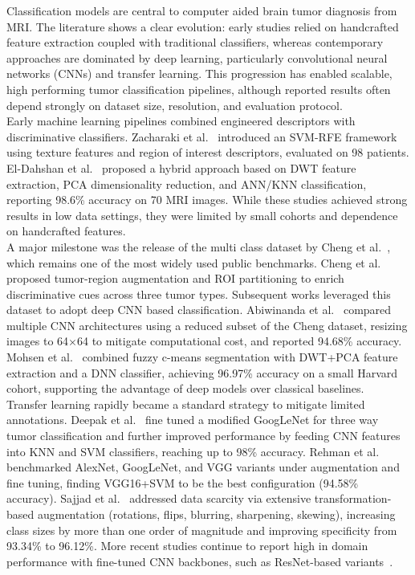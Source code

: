 Classification models are central to computer aided brain tumor diagnosis from MRI. The literature shows a clear evolution: early studies relied on handcrafted feature extraction coupled with traditional classifiers, whereas contemporary approaches are dominated by deep learning, particularly convolutional neural networks (CNNs) and transfer learning. This progression has enabled scalable, high performing tumor classification pipelines, although reported results often depend strongly on dataset size, resolution, and evaluation protocol.\\

Early machine learning pipelines combined engineered descriptors with discriminative classifiers. Zacharaki et al.~\cite{5193232} introduced an SVM-RFE framework using texture features and region of interest descriptors, evaluated on 98 patients. El-Dahshan et al.~\cite{ELDAHSHAN2010433} proposed a hybrid approach based on DWT feature extraction, PCA dimensionality reduction, and ANN/KNN classification, reporting 98.6\% accuracy on 70 MRI images. While these studies achieved strong results in low data settings, they were limited by small cohorts and dependence on handcrafted features.\\

A major milestone was the release of the multi class dataset by Cheng et al.~\cite{Cheng2015}, which remains one of the most widely used public benchmarks. Cheng et al. proposed tumor-region augmentation and ROI partitioning to enrich discriminative cues across three tumor types. Subsequent works leveraged this dataset to adopt deep CNN based classification. Abiwinanda et al.~\cite{abiwinanda} compared multiple CNN architectures using a reduced subset of the Cheng dataset, resizing images to 64$\times$64 to mitigate computational cost, and reported 94.68\% accuracy. Mohsen et al.~\cite{mohsen2018classification} combined fuzzy c-means segmentation with DWT+PCA feature extraction and a DNN classifier, achieving 96.97\% accuracy on a small Harvard cohort, supporting the advantage of deep models over classical baselines.\\

Transfer learning rapidly became a standard strategy to mitigate limited annotations. Deepak et al.~\cite{deepak2019brain} fine tuned a modified GoogLeNet for three way tumor classification and further improved performance by feeding CNN features into KNN and SVM classifiers, reaching up to 98\% accuracy. Rehman et al.~\cite{Rehman2020} benchmarked AlexNet, GoogLeNet, and VGG variants under augmentation and fine tuning, finding VGG16+SVM to be the best configuration (94.58\% accuracy). Sajjad et al.~\cite{sajjad2019multigrade} addressed data scarcity via extensive transformation-based augmentation (rotations, flips, blurring, sharpening, skewing), increasing class sizes by more than one order of magnitude and improving specificity from 93.34\% to 96.12\%. More recent studies continue to report high in domain performance with fine-tuned CNN backbones, such as ResNet-based variants~\cite{kumar2023braintumor}.


